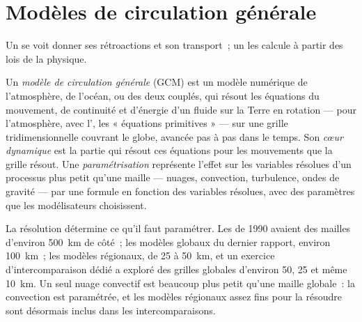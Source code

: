 \section{Modèles de circulation générale}\label{sec:b3:climate-models:gcm}

Un  se voit donner ses rétroactions et son transport~; un
 les calcule à partir des lois de la physique.

\begin{definition}\label{def:b3:climate-models:gcm}
Un \emph{modèle de circulation générale} (GCM)
est un modèle numérique de l'atmosphère, de l'océan, ou des deux couplés,
qui résout les équations du mouvement, de continuité et d'énergie d'un fluide sur
la Terre en rotation --- pour l'atmosphère, avec l', les « équations primitives » --- sur une grille tridimensionnelle
couvrant le globe, avancée pas à pas dans le temps. Son \emph{cœur
dynamique} est la partie qui résout ces équations pour
les mouvements que la grille résout. Une
\emph{paramétrisation} représente l'effet sur
les variables résolues d'un processus plus petit qu'une maille --- nuages,
convection, turbulence, ondes de gravité --- par une formule en fonction des
variables résolues, avec des paramètres que les modélisateurs choisissent.
\end{definition}

La résolution détermine ce qu'il faut paramétrer. Les 
de 1990 avaient des mailles d'environ \qty{500}{km} de côté~; les modèles globaux
du dernier rapport, environ \qty{100}{km}~; les modèles régionaux, de 25 à
\qty{50}{km}, et un exercice d'intercomparaison dédié a exploré des grilles globales
d'environ 50, 25 et même \qty{10}{km}. Un seul nuage convectif est beaucoup plus petit qu'une maille globale~: la convection
est paramétrée, et les modèles régionaux assez fins pour la résoudre sont désormais
inclus dans les intercomparaisons.

